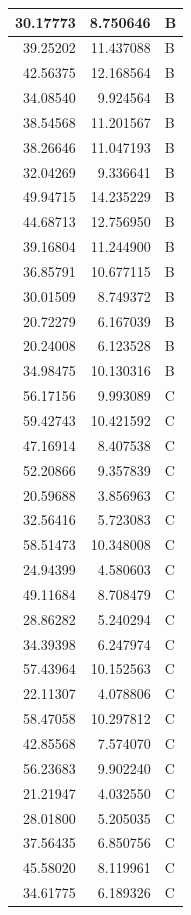 \documentclass[
  letterpaper,
  DIV=11,
  numbers=noendperiod]{scrartcl}
\begin{document}
\begin{table}
\begin{tabular}[t]{r|r|l}
\hline
30.17773 & 8.750646 & B\\
\hline
39.25202 & 11.437088 & B\\
\hline
42.56375 & 12.168564 & B\\
\hline
34.08540 & 9.924564 & B\\
\hline
38.54568 & 11.201567 & B\\
\hline
38.26646 & 11.047193 & B\\
\hline
32.04269 & 9.336641 & B\\
\hline
49.94715 & 14.235229 & B\\
\hline
44.68713 & 12.756950 & B\\
\hline
39.16804 & 11.244900 & B\\
\hline
36.85791 & 10.677115 & B\\
\hline
30.01509 & 8.749372 & B\\
\hline
20.72279 & 6.167039 & B\\
\hline
20.24008 & 6.123528 & B\\
\hline
34.98475 & 10.130316 & B\\
\hline
56.17156 & 9.993089 & C\\
\hline
59.42743 & 10.421592 & C\\
\hline
47.16914 & 8.407538 & C\\
\hline
52.20866 & 9.357839 & C\\
\hline
20.59688 & 3.856963 & C\\
\hline
32.56416 & 5.723083 & C\\
\hline
58.51473 & 10.348008 & C\\
\hline
24.94399 & 4.580603 & C\\
\hline
49.11684 & 8.708479 & C\\
\hline
28.86282 & 5.240294 & C\\
\hline
34.39398 & 6.247974 & C\\
\hline
57.43964 & 10.152563 & C\\
\hline
22.11307 & 4.078806 & C\\
\hline
58.47058 & 10.297812 & C\\
\hline
42.85568 & 7.574070 & C\\
\hline
56.23683 & 9.902240 & C\\
\hline
21.21947 & 4.032550 & C\\
\hline
28.01800 & 5.205035 & C\\
\hline
37.56435 & 6.850756 & C\\
\hline
45.58020 & 8.119961 & C\\
\hline
34.61775 & 6.189326 & C\\

\end{tabular}
\end{table}
\end{document}
